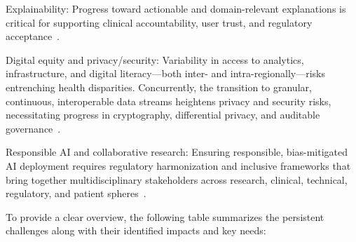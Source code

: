 \documentclass[sigconf]{acmart}
\begin{document}
Explainability: Progress toward actionable and domain-relevant explanations is critical for supporting clinical accountability, user trust, and regulatory acceptance~\cite{ref34,ref51,ref76,ref87}.

Digital equity and privacy/security: Variability in access to analytics, infrastructure, and digital literacy—both inter- and intra-regionally—risks entrenching health disparities. Concurrently, the transition to granular, continuous, interoperable data streams heightens privacy and security risks, necessitating progress in cryptography, differential privacy, and auditable governance~\cite{ref92,ref95,ref99,ref101,ref51,ref95}.

Responsible AI and collaborative research: Ensuring responsible, bias-mitigated AI deployment requires regulatory harmonization and inclusive frameworks that bring together multidisciplinary stakeholders across research, clinical, technical, regulatory, and patient spheres~\cite{ref5,ref13,ref16,ref17,ref18,ref19,ref20,ref21,ref22,ref23,ref24,ref25,ref28,ref30,ref31,ref32,ref33,ref34,ref35,ref36,ref37,ref38,ref39,ref40,ref41,ref42,ref43,ref44,ref45,ref46,ref47,ref48,ref49,ref50,ref51,ref52,ref53,ref54,ref55,ref56,ref57,ref58,ref59,ref60,ref61,ref62,ref63,ref64,ref65,ref66,ref67,ref68,ref69,ref70,ref71,ref72,ref73,ref74,ref75,ref76,ref77,ref78,ref79,ref80,ref81,ref82,ref83,ref84,ref85,ref86,ref87,ref88,ref89,ref90,ref91,ref92,ref94,ref95,ref96,ref97,ref98,ref99,ref100,ref101,ref102,ref103,ref104,ref105,ref106,ref107}.

To provide a clear overview, the following table summarizes the persistent challenges along with their identified impacts and key needs:
\end{document}
